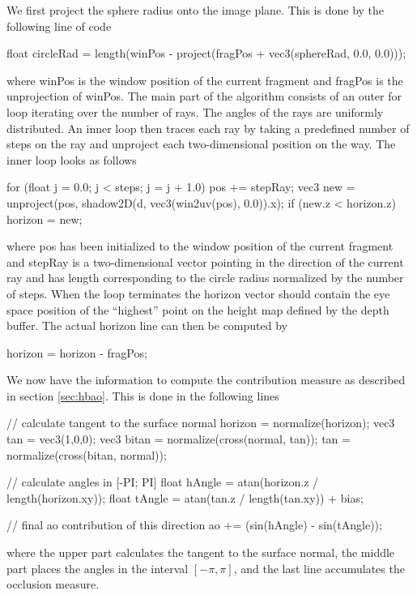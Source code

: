We first project the sphere radius onto the image plane. This is done
by the following line of code
\begin{cppcode}
  float circleRad = length(winPos - project(fragPos + vec3(sphereRad, 0.0, 0.0))); 
\end{cppcode}
where winPos is the window position of the current fragment and
fragPos is the unprojection of winPos.  The main part of the algorithm
consists of an outer for loop iterating over the number of rays. The
angles of the rays are uniformly distributed. An inner loop then
traces each ray by taking a predefined number of steps on the ray and
unproject each two-dimensional position on the way. The inner loop
looks as follows
\begin{cppcode}
  for (float j = 0.0; j < steps; j = j + 1.0) {
    pos += stepRay;
    vec3 new = unproject(pos, shadow2D(d, vec3(win2uv(pos), 0.0)).x);
    if (new.z < horizon.z) {
      horizon = new;
    }
  }
\end{cppcode}
where pos has been initialized to the window position of the current
fragment and stepRay is a two-dimensional vector pointing in the
direction of the current ray and has length corresponding to the
circle radius normalized by the number of steps. When the loop
terminates the horizon vector should contain the eye space position of
the ``highest'' point on the height map defined by the depth
buffer. The actual horizon line can then be computed by
\begin{cppcode}
  horizon = horizon - fragPos;
\end{cppcode}
We now have the information to compute the contribution measure as
described in section \ref{sec:hbao}. This is done in the following lines
\begin{cppcode}
  // calculate tangent to the surface normal
  horizon = normalize(horizon);
  vec3 tan   = vec3(1,0,0);
  vec3 bitan = normalize(cross(normal, tan));
  tan        = normalize(cross(bitan, normal));
  
  // calculate angles in [-PI; PI]
  float hAngle = atan(horizon.z / length(horizon.xy));
  float tAngle = atan(tan.z / length(tan.xy)) + bias;
  
  // final ao contribution of this direction
  ao += (sin(hAngle) - sin(tAngle));
\end{cppcode}
where the upper part calculates the tangent to the surface normal, the
middle part places the angles in the interval $[-\pi,\pi]$, and the
last line accumulates the occlusion measure.

